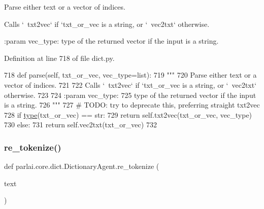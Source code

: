 \begin{DoxyVerb}Parse either text or a vector of indices.

Calls `~txt2vec` if `txt_or_vec is a string, or `~vec2txt` otherwise.

:param vec_type:
    type of the returned vector if the input is a string.
\end{DoxyVerb}
 

Definition at line 718 of file dict.\+py.


\begin{DoxyCode}
718     \textcolor{keyword}{def }parse(self, txt\_or\_vec, vec\_type=list):
719         \textcolor{stringliteral}{"""}
720 \textcolor{stringliteral}{        Parse either text or a vector of indices.}
721 \textcolor{stringliteral}{}
722 \textcolor{stringliteral}{        Calls `~txt2vec` if `txt\_or\_vec is a string, or `~vec2txt` otherwise.}
723 \textcolor{stringliteral}{}
724 \textcolor{stringliteral}{        :param vec\_type:}
725 \textcolor{stringliteral}{            type of the returned vector if the input is a string.}
726 \textcolor{stringliteral}{        """}
727         \textcolor{comment}{# TODO: try to deprecate this, preferring straight txt2vec}
728         \textcolor{keywordflow}{if} \hyperlink{namespaceparlai_1_1agents_1_1tfidf__retriever_1_1build__tfidf_ad5dfae268e23f506da084a9efb72f619}{type}(txt\_or\_vec) == str:
729             \textcolor{keywordflow}{return} self.txt2vec(txt\_or\_vec, vec\_type)
730         \textcolor{keywordflow}{else}:
731             \textcolor{keywordflow}{return} self.vec2txt(txt\_or\_vec)
732 
\end{DoxyCode}
\mbox{\label{classparlai_1_1core_1_1dict_1_1DictionaryAgent_a78edf54954bf0514e1798ce694a758fe}} 
\subsubsection{\texorpdfstring{re\+\_\+tokenize()}{re\_tokenize()}}
{\footnotesize\ttfamily def parlai.\+core.\+dict.\+Dictionary\+Agent.\+re\+\_\+tokenize (\begin{DoxyParamCaption}\item[{}]{text }\end{DoxyParamCaption})\hspace{0.3cm}{\ttfamily [static]}}

